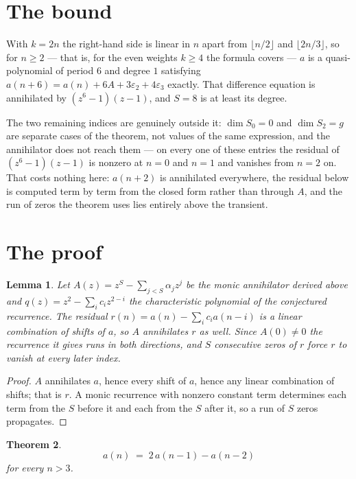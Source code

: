\documentclass[11pt,a4paper]{article}
\theoremstyle{plain}
\newtheorem{theorem}{Theorem}
\newtheorem{lemma}[theorem]{Lemma}
\theoremstyle{definition}
\begin{document}
\section{The bound}

With $k=2n$ the right-hand side is linear in $n$ apart from $\lfloor n/2\rfloor$ and
$\lfloor 2n/3\rfloor$, so for $n\ge2$ --- that is, for the even weights $k\ge4$ the formula
covers --- $a$ is a quasi-polynomial of period $6$ and degree $1$ satisfying
$a(n+6)=a(n)+6A+3\varepsilon_2+4\varepsilon_3$ exactly. That difference equation is annihilated
by $(z^6-1)(z-1)$, and $S=8$ is at least its degree.

The two remaining indices are genuinely outside it: $\dim S_0=0$ and $\dim S_2=g$ are separate
cases of the theorem, not values of the same expression, and the annihilator does not reach
them --- on every one of these entries the residual of $(z^6-1)(z-1)$ is nonzero at $n=0$ and
$n=1$ and vanishes from $n=2$ on. That costs nothing here: $a(n+2)$ is annihilated everywhere,
the residual below is computed term by term from the closed form rather than through $A$, and
the run of zeros the theorem uses lies entirely above the transient.

\section{The proof}

\begin{lemma}\label{lem:crit}
Let $A(z)=z^S-\sum_{j<S}\alpha_jz^{j}$ be the monic annihilator derived above and
$q(z)=z^{2}-\sum_ic_iz^{2-i}$ the characteristic polynomial of the conjectured
recurrence. The residual $r(n)=a(n)-\sum_ic_ia(n-i)$ is a linear combination of shifts of $a$,
so $A$ annihilates $r$ as well. Since $A(0)\ne0$ the recurrence it gives runs in both
directions, and $S$ consecutive zeros of $r$ force $r$ to vanish at every later index.
\end{lemma}

\begin{proof}
$A$ annihilates $a$, hence every shift of $a$, hence any linear combination of shifts; that is
$r$. A monic recurrence with nonzero constant term determines each term from the $S$ before it
and each from the $S$ after it, so a run of $S$ zeros propagates.
\end{proof}

\begin{theorem}
\[
a(n)\;=\;2\,a(n-1) - a(n-2)
\]
for every $n>3$.
\end{theorem}
\end{document}
